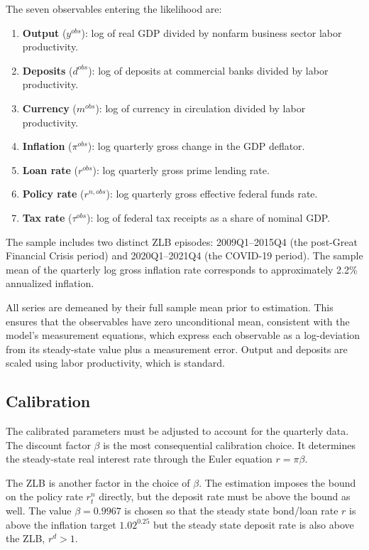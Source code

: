 \documentclass[]{article}
\begin{document}
The seven observables entering the likelihood are:
\begin{enumerate}
  \item \textbf{Output} ($y^{obs}$): log of real GDP divided by nonfarm business sector labor productivity.
  \item \textbf{Deposits} ($d^{obs}$): log of deposits at commercial banks divided by labor productivity.
   \item \textbf{Currency} ($m^{obs}$): log of currency in circulation divided by labor productivity.
  \item \textbf{Inflation} ($\pi^{obs}$): log quarterly gross change in the GDP deflator.
  \item \textbf{Loan rate} ($r^{obs}$): log quarterly gross prime lending rate.
  \item \textbf{Policy rate} ($r^{n,obs}$): log quarterly gross effective federal funds rate.
  \item \textbf{Tax rate} ($\tau^{obs}$): log of federal tax receipts as a share of nominal GDP.
\end{enumerate}

The sample includes two distinct ZLB episodes: 2009Q1--2015Q4 (the post-Great Financial Crisis period) and 2020Q1--2021Q4 (the COVID-19 period).  The sample mean of the quarterly log gross inflation rate corresponds to approximately 2.2\% annualized inflation.

All series are demeaned by their full sample mean prior to estimation.  This ensures that the observables have zero unconditional mean, consistent with the model's measurement equations, which express each observable as a log-deviation from its steady-state value plus a measurement error. Output and deposits are scaled using labor productivity, which is standard.

\subsection{Calibration}

The calibrated parameters must be adjusted to account for the quarterly data. The discount factor $\beta$ is the most consequential calibration choice.  It determines the steady-state real interest rate through the Euler equation $r=\pi \beta$.

The ZLB is another factor in the choice of $\beta$. The estimation imposes the bound on the policy rate $r^{n}_{t}$ directly, but the deposit rate must be above the bound as well. The value $\beta = 0.9967$ is chosen so that the steady state bond/loan rate $r$ is above the inflation target $1.02^{0.25}$ but the steady state deposit rate is also above the ZLB, $r^{d}>1$.
\end{document}
